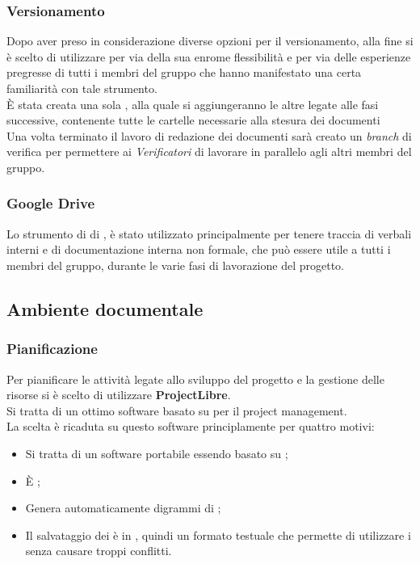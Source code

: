     \subsubsection{Versionamento}
      Dopo aver preso in considerazione diverse opzioni per il versionamento, alla fine si è scelto di utilizzare \textbf{} per via della
      sua enrome flessibilità e per via delle esperienze pregresse di tutti i membri del gruppo che hanno manifestato una certa familiarità con
      tale strumento.\\
      È stata creata una sola , alla quale si aggiungeranno le altre legate alle fasi successive, contenente tutte le cartelle necessarie
      alla stesura dei documenti \glossaryItem{\LaTeX}\.\\
      Una volta terminato il lavoro di redazione dei documenti sarà creato un \emph{branch} di verifica per permettere ai \emph{Verificatori} di
      lavorare in parallelo agli altri membri del gruppo.
    \subsubsection{Google Drive}
      Lo strumento di  di , è stato utilizzato principalmente per tenere traccia di verbali interni e di documentazione interna
      non formale, che può essere utile a tutti i membri del gruppo, durante le varie fasi di lavorazione del progetto.
  \subsection{Ambiente documentale}
    \subsubsection{Pianificazione}
      Per pianificare le attività legate allo sviluppo del progetto e la gestione delle risorse si è scelto di utilizzare \textbf{ProjectLibre}.\\
      Si tratta di un ottimo software  basato su  per il project management.\\
      La scelta è ricaduta su questo software principlamente per quattro motivi:
      \begin{itemize}
        \item Si tratta di un software portabile essendo basato su ;
        \item È ;
        \item Genera automaticamente digrammi di ;
        \item Il salvataggio dei  è in , quindi un formato testuale che permette di utilizzare i  senza causare troppi conflitti.
      \end{itemize}
